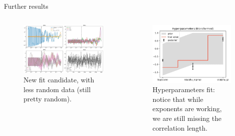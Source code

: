 \documentclass[9pt]{beamer}
\begin{document}
\begin{frame}{Further results}
    \vspace*{30pt}
    \begin{columns}
        \begin{column}{0.6\textwidth}
            \begin{figure}
                \centering
                \includegraphics[width=\textwidth]{fit-pdf-new}
                \caption{
                    New fit candidate, with less random data (still pretty
                    random).
                }
            \end{figure} 
        \end{column}
        \begin{column}{0.4\textwidth}
            \begin{figure}
                \centering
                \includegraphics[width=\textwidth]{fit-hyper-new}
                \caption{
                    Hyperparameters fit: notice that while exponents are
                    working, we are still missing the correlation length.
                }
            \end{figure} 
        \end{column}
    \end{columns}
\end{frame}
\end{document}
